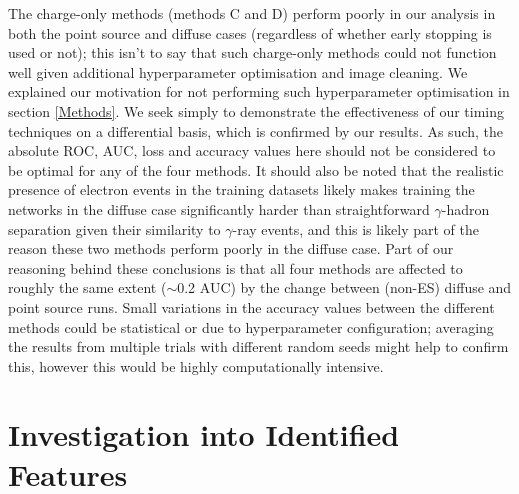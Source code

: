 The charge-only methods \cite{Shilon} (methods C and D) perform poorly in our analysis in both the point source and diffuse cases (regardless of whether early stopping is used or not); this isn't to say that such charge-only methods could not function well given additional hyperparameter optimisation and image cleaning. We explained our motivation for not performing such hyperparameter optimisation in section \ref{Methods}. We seek simply to demonstrate the effectiveness of our timing techniques on a differential basis, which is confirmed by our results. As such, the absolute ROC, AUC, loss and accuracy values here should not be considered to be optimal for any of the four methods. It should also be noted that the realistic presence of electron events in the training datasets likely makes training the networks in the diffuse case significantly harder than straightforward $\gamma$-hadron separation given their similarity to $\gamma$-ray events, and this is likely part of the reason these two methods perform poorly in the diffuse case. Part of our reasoning behind these conclusions is that all four methods are affected to roughly the same extent ($\sim$0.2 AUC) by the change between (non-ES) diffuse and point source runs. Small variations in the accuracy values between the different methods could be statistical or due to hyperparameter configuration; averaging the results from multiple trials with different random seeds might help to confirm this, however this would be highly computationally intensive.

\section{Investigation into Identified Features}

